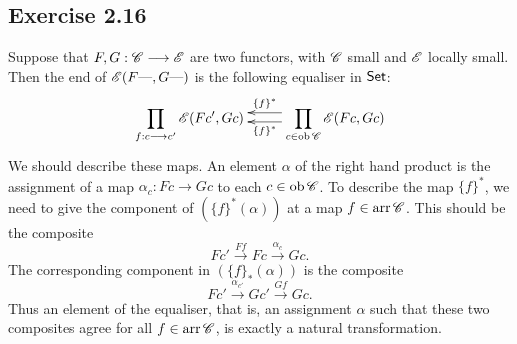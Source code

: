 \documentclass[11pt]{article}
\begin{document}
\begin{solutions}
\subsection*{Exercise 2.16}
Suppose that $F,G:\mathscr{C}\longrightarrow\mathscr{E}$ are two functors, with $\mathscr{C}$ small and $\mathscr{E}$ locally small.
Then the end of $\mathscr{E}(F\textup{---} ,G\textup{---} )$ is the following equaliser in $\operatorname{{\mathsf{Set}}}$:
\[\vcenter{\xymatrix{
\displaystyle\prod_{f:c\to c'}\scrE(Fc',Gc)&%
\displaystyle\prod_{c\in\ob\scrC}\scrE(Fc,Gc)
\ar@<-1ex>[l]_-{\{f\}^*}
\ar@<.51ex>[l]^-{\{f\}^*}
}}\]
We should describe these maps. An element $\alpha$ of the right hand product is the assignment of a map $\alpha_c:Fc\to Gc$ to each $c\in\textup{ob}\,\mathscr{C}$. To describe  the map $\{f\}^*$, we need to give the component of $(\{f\}^*(\alpha))$ at a map $f\in\textup{arr}\,\mathscr{C}$. This should be the composite
\[Fc'\overset{Ff}{\to}Fc\overset{\alpha_c}{\to}Gc.\]
The corresponding component in $(\{f\}_*(\alpha))$ is the composite
\[Fc'\overset{\alpha_{c'}}{\to}Gc'\overset{Gf}{\to}Gc.\]
Thus an element of the equaliser, that is, an assignment $\alpha$ such that these two composites agree for all $f\in\textup{arr}\,\mathscr{C}$, is exactly a natural transformation.

\end{solutions}
\end{document}
